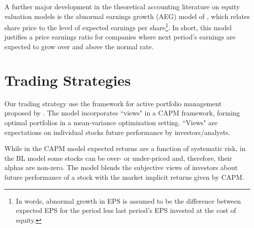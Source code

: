 \documentclass{article}\usepackage[]{graphicx}\usepackage[]{color}
\newcommand{\tr}{\textit{true}}
\newcommand{\naive}{\textit{recent}}
\newcommand{\default}{\textit{all-time}}
\begin{document}
A further major development in the theoretical accounting literature on equity valuation models is the abnormal earnings growth (AEG) model of \cite{ohlson2005}, which relates share price to the level of expected earnings per share\footnote{In words, abnormal growth in EPS is assumed to be the difference between expected EPS for the period less last period’s EPS invested at the cost of equity.}. In short, this model justifies a price earnings ratio for companies where next period’s earnings are expected to grow over and above the normal rate.








\section{Trading Strategies}
\label{sec:trading}
Our trading strategy use the framework for  active portfolio management proposed by \cite{black1992}.  The model incorporates ``views" in a CAPM framework, forming optimal portfolios in a mean-variance optimization setting. ``Views" are expectations on individual stocks future performance by investors/analysts. 

While in the CAPM model expected returns are a function of systematic risk, in the BL model some stocks can be over- or under-priced and, therefore, their alphas are non-zero. The model blends the subjective views of investors about future performance of a stock with the market implicit returns given by CAPM.
\end{document}
